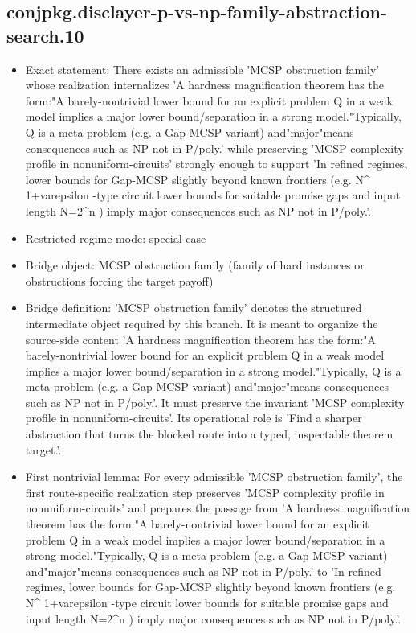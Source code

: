 \documentclass[11pt]{article}
\begin{document}
\subsection*{conjpkg.disclayer-p-vs-np-family-abstraction-search.10}
\begin{itemize}
\item Exact statement: There exists an admissible 'MCSP obstruction family' whose realization internalizes 'A hardness magnification theorem has the form:"A barely-nontrivial lower bound for an explicit problem Q in a weak model implies a major lower bound/separation in a strong model."Typically, Q is a meta-problem (e.g. a Gap-MCSP variant) and"major"means consequences such as NP not in P/poly.' while preserving 'MCSP complexity profile in nonuniform-circuits' strongly enough to support 'In refined regimes, lower bounds for Gap-MCSP slightly beyond known frontiers (e.g. N\textasciicircum{} 1+varepsilon -type circuit lower bounds for suitable promise gaps and input length N=2\textasciicircum{}n ) imply major consequences such as NP not in P/poly.'.
\item Restricted-regime mode: special-case
\item Bridge object: MCSP obstruction family (family of hard instances or obstructions forcing the target payoff)
\item Bridge definition: 'MCSP obstruction family' denotes the structured intermediate object required by this branch. It is meant to organize the source-side content 'A hardness magnification theorem has the form:"A barely-nontrivial lower bound for an explicit problem Q in a weak model implies a major lower bound/separation in a strong model."Typically, Q is a meta-problem (e.g. a Gap-MCSP variant) and"major"means consequences such as NP not in P/poly.'. It must preserve the invariant 'MCSP complexity profile in nonuniform-circuits'. Its operational role is 'Find a sharper abstraction that turns the blocked route into a typed, inspectable theorem target.'.
\item First nontrivial lemma: For every admissible 'MCSP obstruction family', the first route-specific realization step preserves 'MCSP complexity profile in nonuniform-circuits' and prepares the passage from 'A hardness magnification theorem has the form:"A barely-nontrivial lower bound for an explicit problem Q in a weak model implies a major lower bound/separation in a strong model."Typically, Q is a meta-problem (e.g. a Gap-MCSP variant) and"major"means consequences such as NP not in P/poly.' to 'In refined regimes, lower bounds for Gap-MCSP slightly beyond known frontiers (e.g. N\textasciicircum{} 1+varepsilon -type circuit lower bounds for suitable promise gaps and input length N=2\textasciicircum{}n ) imply major consequences such as NP not in P/poly.'.

\end{itemize}
\end{document}
